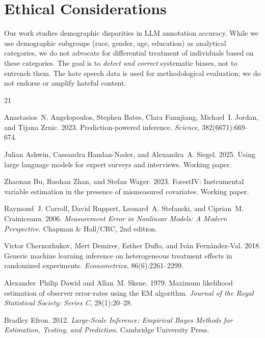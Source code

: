 \documentclass[11pt,a4paper]{article}
\begin{document}
\section*{Ethical Considerations}

Our work studies demographic disparities in LLM annotation accuracy.
While we use demographic subgroups (race, gender, age, education) as analytical categories, we do not advocate for differential treatment of individuals based on these categories.
The goal is to \emph{detect and correct} systematic biases, not to entrench them.
The hate speech data is used for methodological evaluation; we do not endorse or amplify hateful content.

\begin{thebibliography}{21}

Anastasios~N. Angelopoulos, Stephen Bates, Clara Fannjiang, Michael~I. Jordan, and Tijana Zrnic.
2023.
Prediction-powered inference.
{\em Science}, 382(6671):669--674.

Julian Ashwin, Cassandra Handan-Nader, and Alexandra~A. Siegel.
2025.
Using large language models for expert surveys and interviews.
Working paper.

Zhaonan Bu, Ruohan Zhan, and Stefan Wager.
2023.
{ForestIV}: Instrumental variable estimation in the presence of mismeasured covariates.
Working paper.

Raymond~J. Carroll, David Ruppert, Leonard~A. Stefanski, and Ciprian~M. Crainiceanu.
2006.
{\em Measurement Error in Nonlinear Models: A Modern Perspective}.
Chapman \& Hall/CRC, 2nd edition.

Victor Chernozhukov, Mert Demirer, Esther Duflo, and Iv{\'a}n Fern{\'a}ndez-Val.
2018.
Generic machine learning inference on heterogeneous treatment effects in randomized experiments.
{\em Econometrica}, 86(6):2261--2299.

Alexander~Philip Dawid and Allan~M. Skene.
1979.
Maximum likelihood estimation of observer error-rates using the {EM} algorithm.
{\em Journal of the Royal Statistical Society: Series C}, 28(1):20--28.

Bradley Efron.
2012.
{\em Large-Scale Inference: Empirical Bayes Methods for Estimation, Testing, and Prediction}.
Cambridge University Press.


\end{thebibliography}
\end{document}
